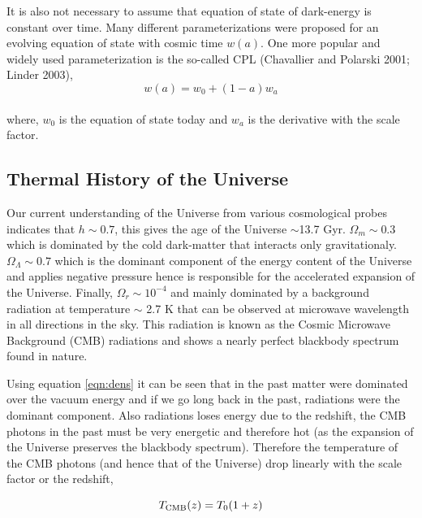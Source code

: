 It is also not necessary to assume that equation of state of dark-energy
is constant over time. Many different parameterizations were proposed
for an evolving equation of state with cosmic time $w(a)$. One more popular
and widely used parameterization is the so-called CPL (Chavallier and Polarski
2001; Linder 2003),
\begin{equation}
	w(a) = w_0 + (1-a)w_a
\end{equation}
\\
where, $w_0$ is the equation of state today and $w_a$ is the derivative with
the scale factor. 

\subsection{Thermal History of the Universe}

Our current understanding of the Universe from various cosmological probes 
indicates that $h \sim 0.7$, this gives the
age of the Universe $\sim$13.7 Gyr.  $\Omega_m \sim 0.3$ which is dominated
by the cold dark-matter that interacts only gravitationaly.
$\Omega_{\Lambda} \sim 0.7$ which is the dominant component of the energy
content of the Universe and applies negative pressure hence is responsible
for the accelerated expansion of the Universe. Finally, $\Omega_r \sim 10^{-4}$
and mainly dominated by a background radiation at temperature $\sim$ 2.7 K that
can be observed at microwave wavelength in all directions in the sky. This radiation is
known as the Cosmic Microwave Background (CMB) radiations and shows a nearly
perfect blackbody spectrum found in nature.

Using equation \ref{eqn:dens}
it can be seen that in the past matter were dominated over the vacuum 
energy and if we go long back in the past, radiations were the dominant 
component. Also  radiations loses energy due 
to the redshift, the CMB photons in the past must be very energetic and
therefore hot (as the expansion of the Universe preserves the blackbody 
spectrum). Therefore the temperature of the CMB photons (and hence that 
of the Universe) drop linearly with the scale factor or the redshift,

\begin{equation}
	T_{\rm CMB}(z) = T_0(1+z)
\end{equation}


